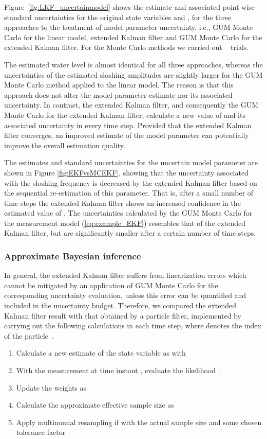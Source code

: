 \documentclass[10pt]{article}
\begin{document}
\begin{spacing}{1}
Figure~\ref{fig:LKF_uncertainmodel} shows the estimate and associated point-wise standard uncertainties for the original state variables  and , for the three approaches to the treatment of model parameter uncertainty, i.e., GUM Monte Carlo for the linear model, extended Kalman filter and GUM Monte Carlo for the extended Kalman filter. For the Monte Carlo methods we carried out ~ trials.

The estimated water level  is almost identical for all three approaches, whereas the uncertainties of the estimated sloshing amplitudes are slightly larger for the GUM Monte Carlo method applied to the linear model. The reason is that this approach does not alter the model parameter estimate nor its associated uncertainty. In contrast, the extended Kalman filter, and consequently the GUM Monte Carlo for the extended Kalman filter, calculate a new value of  and its associated uncertainty in every time step. Provided that the extended Kalman filter converges, an improved estimate of the model parameter can potentially improve the overall estimation quality.

The estimates and standard uncertainties for the uncertain model parameter are shown in Figure \ref{fig:EKFvsMCEKF}, showing that the uncertainty associated with the sloshing frequency  is decreased by the extended Kalman filter based on the sequential re-estimation of this parameter. That is, after a small number of time steps the extended Kalman filter shows an increased confidence in the estimated value of . The uncertainties calculated by the GUM Monte Carlo for the measurement model (\ref{eq:example_EKF}) resembles that of the extended Kalman filter, but are significantly smaller after a certain number of time steps.



\subsubsection*{Approximate Bayesian inference}
In general, the extended Kalman filter suffers from linearization errors which cannot be mitigated by an application of GUM Monte Carlo for the corresponding uncertainty evaluation, unless this error can be quantified and included in the uncertainty budget. Therefore, we compared the extended Kalman filter result with that obtained by a particle filter, implemented by carrying out the following calculations in each time step, where  denotes the index of the particle~\cite{Arulampalam:2002hg}.
\begin{enumerate}
 \item Calculate a new estimate of the state variable as  with 
 \item With  the measurement at time instant , evaluate the likelihood .
\item Update the weights as 
 \item Calculate the approximate effective sample size as 
 \item Apply multinomial resampling if  with  the actual sample size and  some chosen tolerance factor
\end{enumerate} 


\end{spacing}
\end{document}
